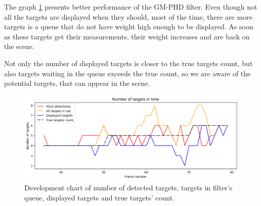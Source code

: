 The graph \ref{gr:E1-V1-S1} presents better performance of the GM-PHD filter. Even though not all the targets are displayed when they should, most of the time, there are more targets is a queue that do not have weight high enough to be displayed. As soon as these targets get their measurements, their weight increases and are back on the scene.

Not only the number of displayed targets is closer to the true targets count, but also targets waiting in the queue exceeds the true count, so we are aware of the potential targets, that can appear in the scene.

\begin{figure}[H]
    \centering
    \includegraphics[width=\linewidth]{../../../experiments/E1/V1/YOLO/yolo_det}
    \caption{Development chart of number of detected targets, targets in filter's queue, displayed targets and true targets' count.}
    \label{gr:E1-V1-S1}
\end{figure}

